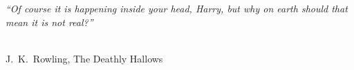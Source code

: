 \thispagestyle{empty}
\vspace*{\fill}

\begin{flushright}
\large {\em ``Of course it is happening inside your head, Harry, but why on earth should that mean it is not real?''} 
\\

\ \

\normalsize
{J.~K.~Rowling, The Deathly Hallows}
\end{flushright}




\vspace*{\fill}

\vspace*{\fill}

\vspace*{\fill}

